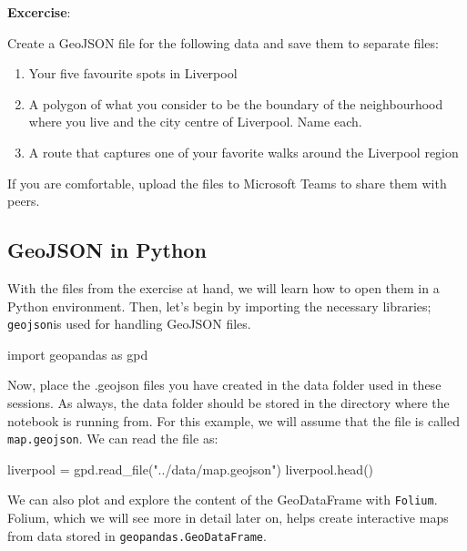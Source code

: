 \documentclass[
  letterpaper,
  DIV=11,
  numbers=noendperiod]{scrreprt}
\newenvironment{Shaded}{\begin{snugshade}}{\end{snugshade}}
\newcommand{\ImportTok}[1]{\textcolor[rgb]{0.00,0.46,0.62}{#1}}
\newcommand{\NormalTok}[1]{\textcolor[rgb]{0.00,0.23,0.31}{#1}}
\newcommand{\OperatorTok}[1]{\textcolor[rgb]{0.37,0.37,0.37}{#1}}
\newcommand{\StringTok}[1]{\textcolor[rgb]{0.13,0.47,0.30}{#1}}
\providecommand{\tightlist}{%
  \setlength{\itemsep}{0pt}\setlength{\parskip}{0pt}}\usepackage{longtable,booktabs,array}
\begin{document}
\textbf{Excercise}:

Create a GeoJSON file for the following data and save them to separate
files:

\begin{enumerate}
\def\labelenumi{\arabic{enumi}.}
\tightlist
\item
  Your five favourite spots in Liverpool
\item
  A polygon of what you consider to be the boundary of the neighbourhood
  where you live and the city centre of Liverpool. Name each.
\item
  A route that captures one of your favorite walks around the Liverpool
  region
\end{enumerate}

If you are comfortable, upload the files to Microsoft Teams to share
them with peers.

\subsection{GeoJSON in Python}\label{geojson-in-python}

With the files from the exercise at hand, we will learn how to open them
in a Python environment. Then, let's begin by importing the necessary
libraries; \texttt{geojson}is used for handling GeoJSON files.

\begin{Shaded}
\begin{Highlighting}[]
\ImportTok{import}\NormalTok{ geopandas }\ImportTok{as}\NormalTok{ gpd}
\end{Highlighting}
\end{Shaded}

Now, place the .geojson files you have created in the data folder used
in these sessions. As always, the data folder should be stored in the
directory where the notebook is running from. For this example, we will
assume that the file is called \texttt{map.geojson}. We can read the
file as:

\begin{Shaded}
\begin{Highlighting}[]
\NormalTok{liverpool }\OperatorTok{=}\NormalTok{ gpd.read\_file(}\StringTok{"../data/map.geojson"}\NormalTok{)}
\NormalTok{liverpool.head()}
\end{Highlighting}
\end{Shaded}

We can also plot and explore the content of the GeoDataFrame with
\texttt{Folium}. Folium, which we will see more in detail later on,
helps create interactive maps from data stored in
\texttt{geopandas.GeoDataFrame}.
\end{document}
